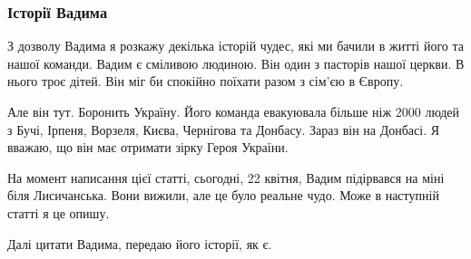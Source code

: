  
 
 
 
 

\subsubsection{Історії Вадима}

З дозволу Вадима я розкажу декілька історій чудес, які ми бачили в житті його
та нашої команди. Вадим є сміливою людиною. Він один з пасторів нашої церкви. В
нього троє дітей. Він міг би спокійно поїхати разом з сім'єю в Європу.

Але він тут. Боронить Україну. Його команда евакуювала більше ніж 2000 людей з
Бучі, Ірпеня, Ворзеля, Києва, Чернігова та Донбасу. Зараз він на Донбасі. Я
вважаю, що він має отримати зірку Героя України.


На момент написання цієї статті, сьогодні, 22 квітня, Вадим підірвався на міні
біля Лисичанська. Вони вижили, але це було реальне чудо. Може в наступній
статті я це опишу.

Далі цитати Вадима, передаю його історії, як є.
